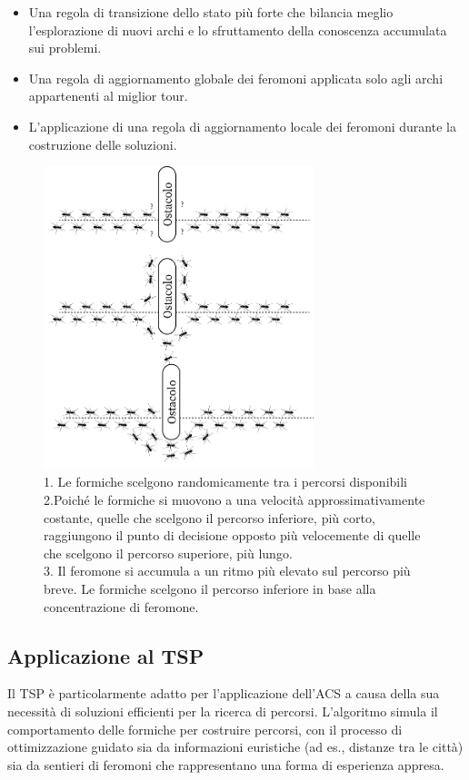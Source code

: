 \begin{itemize}
	\item Una regola di transizione dello stato più forte che bilancia meglio l'esplorazione di nuovi archi e lo sfruttamento della conoscenza accumulata sui problemi.
	\item Una regola di aggiornamento globale dei feromoni applicata solo agli archi appartenenti al miglior tour.
	\item L'applicazione di una regola di aggiornamento locale dei feromoni durante la costruzione delle soluzioni.
\end{itemize}

\begin{figure}[]
	\centering
	\includegraphics[width=0.7\textwidth]{Chapters/Figures/ants_path.png}
	\caption{1. Le formiche scelgono randomicamente tra i percorsi disponibili\\2.Poiché le formiche si muovono a una velocità approssimativamente costante, quelle che scelgono il percorso inferiore, più corto, raggiungono il punto di decisione opposto più velocemente di quelle che scelgono il percorso superiore, più lungo.\\3. Il feromone si accumula a un ritmo più elevato sul percorso più breve. Le formiche scelgono il percorso inferiore in base alla concentrazione di feromone.}
\end{figure}

\subsection{Applicazione al \gls{TSP}}
Il \gls{TSP} è particolarmente adatto per l'applicazione dell'\gls{ACS} a causa della sua necessità di soluzioni efficienti per la ricerca di percorsi. L'algoritmo simula il comportamento delle formiche per costruire percorsi, con il processo di ottimizzazione guidato sia da informazioni euristiche (ad es., distanze tra le città) sia da sentieri di feromoni che rappresentano una forma di esperienza appresa\cite{Dorigo1997, Gambardella1995}.

